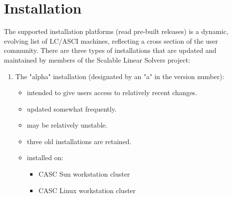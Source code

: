 \chapter{Installation}
\label{Installation}

The supported installation platforms (read pre-built \hypre{} releases)
is a dynamic, evolving list of LC/ASCI machines, reflecting a cross
section of the \hypre{} user community.
There are three types of \hypre{} installations that are updated and
maintained by members of the Scalable Linear Solvers project:
\begin{enumerate}

\item The "alpha" installation (designated by an "a" in the version number):
   \begin{itemize}
   \item intended to give users access to relatively recent changes.
   \item updated somewhat frequently.
   \item may be relatively unstable.
   \item three old installations are retained.
   \item installed on:
      \begin{itemize}
      \item CASC Sun workstation cluster
      \item CASC Linux workstation cluster
      \end{itemize}
   \end{itemize}


\end{enumerate}
